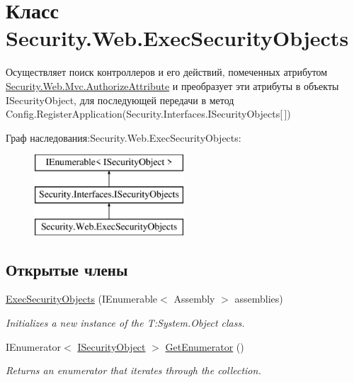 \hypertarget{class_security_1_1_web_1_1_exec_security_objects}{}\section{Класс Security.\+Web.\+Exec\+Security\+Objects}
\label{class_security_1_1_web_1_1_exec_security_objects}


Осуществляет поиск контроллеров и его действий, помеченных атрибутом \hyperlink{class_security_1_1_web_1_1_mvc_1_1_authorize_attribute}{Security.\+Web.\+Mvc.\+Authorize\+Attribute} и преобразует эти атрибуты в объекты I\+Security\+Object, для последующей передачи в метод Config.\+Register\+Application(\+Security.\+Interfaces.\+I\+Security\+Objects\mbox{[}$\,$\mbox{]})  


Граф наследования\+:Security.\+Web.\+Exec\+Security\+Objects\+:\begin{figure}[H]
\begin{center}
\leavevmode
\includegraphics[height=3.000000cm]{d4/d8b/class_security_1_1_web_1_1_exec_security_objects}
\end{center}
\end{figure}
\subsection*{Открытые члены}
\begin{DoxyCompactItemize}
\item 
\hyperlink{class_security_1_1_web_1_1_exec_security_objects_ac4684f99a5b5b39fd677eb74c741a0af}{Exec\+Security\+Objects} (I\+Enumerable$<$ Assembly $>$ assemblies)
\begin{DoxyCompactList}\small\item\em Initializes a new instance of the T\+:\+System.\+Object class. \end{DoxyCompactList}\item 
I\+Enumerator$<$ \hyperlink{interface_security_1_1_interfaces_1_1_i_security_object}{I\+Security\+Object} $>$ \hyperlink{class_security_1_1_web_1_1_exec_security_objects_ab850ef8580c7aba16657c2711e67f883}{Get\+Enumerator} ()
\begin{DoxyCompactList}\small\item\em Returns an enumerator that iterates through the collection. \end{DoxyCompactList}\end{DoxyCompactItemize}


